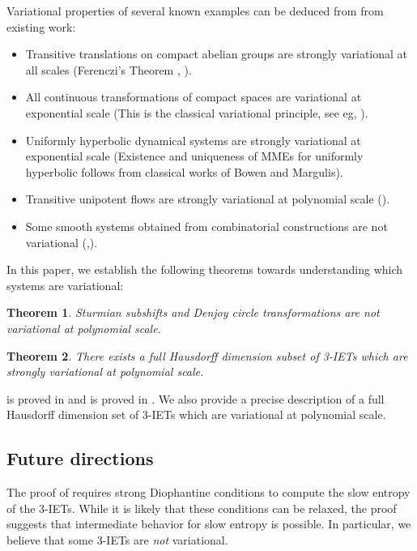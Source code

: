 \documentclass[oneside]{amsart}
\theoremstyle{plain}
\newtheorem{THM}{Theorem}[section]
\theoremstyle{definition}
\newcommand{\<}{\langle}
\renewcommand{\>}{\rangle}
\renewcommand{\|}{|\!|} %
\begin{document}
Variational properties of several known examples can be deduced from from existing work:

\begin{itemize}
    \item Transitive translations on compact abelian groups are strongly variational at all scales (Ferenczi's Theorem \cite{Ferenczi0}, ).
    \item All continuous transformations of compact spaces are variational at exponential scale (This is the classical variational principle, see eg, \cite[Theorem 4.5.3]{hasselblatt-katok}).
    \item Uniformly hyperbolic dynamical systems are strongly variational at exponential scale (Existence and uniqueness of MMEs for uniformly hyperbolic follows from classical works of Bowen and Margulis).
    \item Transitive unipotent flows are strongly variational at polynomial scale (\cite{ParabolicFlows}).
    \item Some smooth systems obtained from combinatorial constructions are not variational (\cite{BanKunWei1},\cite{BanKunWei2}).
\end{itemize}

In this paper, we establish the following theorems towards understanding which systems are variational:

\begin{THM}
    \label{thm:sturmian}
    Sturmian subshifts and Denjoy circle transformations are not variational at polynomial scale.
\end{THM}

\begin{THM}
\label{thm:3iet-main}
    There exists a full Hausdorff dimension subset of 3-IETs which are strongly variational at polynomial scale.
\end{THM}

  is proved in  and   is proved in  . We also provide a precise description of a full Hausdorff dimension set of 3-IETs which are variational at polynomial scale.

\subsection{Future directions}

The proof of  requires strong Diophantine conditions to compute the slow entropy of the 3-IETs. While it is likely that these conditions can be relaxed, the proof suggests that intermediate behavior for slow entropy is possible. In particular, we believe that some 3-IETs are {\it not} variational.
\end{document}
